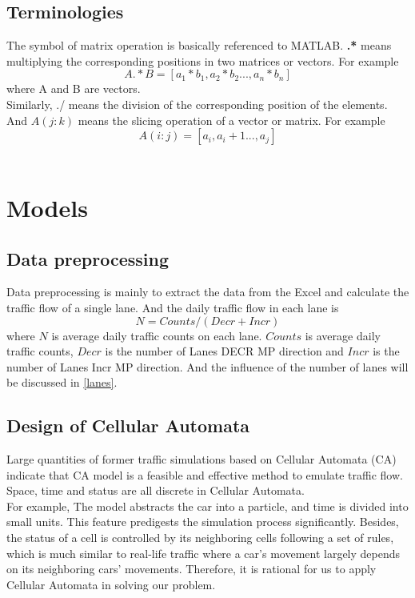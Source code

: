 \documentclass{mcmthesis}
\begin{document}
\subsection{Terminologies}
The symbol of matrix operation is basically referenced to MATLAB.
\textbf{.*} means multiplying the corresponding positions in two matrices or vectors. For example 
\begin{equation}
	A.*B=[a_1*b_1,a_2*b_2...,a_n*b_n]
\end{equation}
where A and B are vectors.\\
\indent Similarly, ./ means the division of the corresponding position of the elements. And $A(j:k)$ means the slicing operation of a vector or matrix. For example
\begin{equation}
A(i:j)=[a_i,a_i+1...,a_j]
\end{equation}
\
\section{Models}
\subsection{Data preprocessing}
Data preprocessing is mainly to extract the data from the Excel and calculate the traffic flow of a single lane. And the daily traffic flow in each lane is\\
\begin{equation}
N=Counts/(Decr+Incr)
\end{equation}
where $N$ is average daily traffic counts on each lane. $Counts$ is average daily traffic counts, $Decr$ is the number of Lanes DECR MP direction and $Incr$ is the number of Lanes Incr MP direction. And the influence of the number of lanes will be discussed in \ref{lanes}.\\

\subsection{Design of Cellular Automata }
Large quantities of former traffic simulations based on Cellular Automata (CA) indicate that CA model is a feasible and effective method to emulate traffic flow. Space, time and status are all discrete in Cellular Automata. \\
\indent For example, The model abstracts the car into a particle, and time is divided into small units. This feature predigests the simulation process significantly. Besides, the status of a cell is controlled by its neighboring cells following a set of rules, which is much similar to real-life traffic where a car's movement largely depends on its neighboring cars' movements. Therefore, it is rational for us to apply Cellular Automata in solving our problem.\\
\end{document}
